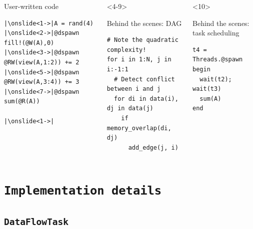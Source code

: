\documentclass{beamer}
\begin{document}
\begin{frame}[fragile]

\begin{columns}[T]
\begin{exampleblock}{User-written code}
\begin{verbatim}
|\onslide<1->|A = rand(4)
|\onslide<2->|@dspawn fill!(@W(A),0)
|\onslide<3->|@dspawn @RW(view(A,1:2)) += 2
|\onslide<5->|@dspawn @RW(view(A,3:4)) += 3
|\onslide<7->|@dspawn sum(@R(A))

|\onslide<1->|
\end{verbatim}    
\end{exampleblock}
  
\begin{onlyenv}<4-9>
  \begin{exampleblock}{Behind the scenes: DAG}
\begin{verbatim}
# Note the quadratic complexity!
for i in 1:N, j in i:-1:1
  # Detect conflict between i and j
  for di in data(i), dj in data(j)
    if memory_overlap(di, dj)
      add_edge(j, i)
\end{verbatim}
\end{exampleblock}
\end{onlyenv}
\begin{onlyenv}<10>
\begin{exampleblock}{Behind the scenes: task scheduling}
\begin{verbatim}
t4 = Threads.@spawn begin
  wait(t2); wait(t3)
  sum(A)
end
\end{verbatim}
\end{exampleblock}
\end{onlyenv}
\end{columns}


\end{frame}


\section{\texttt{Implementation details}}

\subsection{\texttt{DataFlowTask}}
\end{document}
